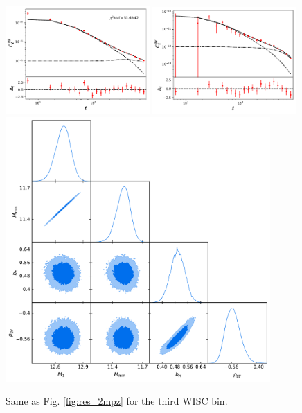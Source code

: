 \documentclass{article}
\begin{document}
  \begin{figure}
    \centering
    \includegraphics[width = 0.49\textwidth]{../output_test/sampler_minimal_hmc_wisc3_cls_wisc3_wisc3}
    \includegraphics[width = 0.49\textwidth]{../output_test/sampler_minimal_hmc_wisc3_cls_wisc3_y_milca}
    \includegraphics[width = 0.90\textwidth]{../output_test/sampler_minimal_hmc_wisc3_triangle}
    \caption{Same as Fig. \ref{fig:res_2mpz} for the third WISC bin.}\label{fig:res_wisc3}
  \end{figure}
\end{document}
